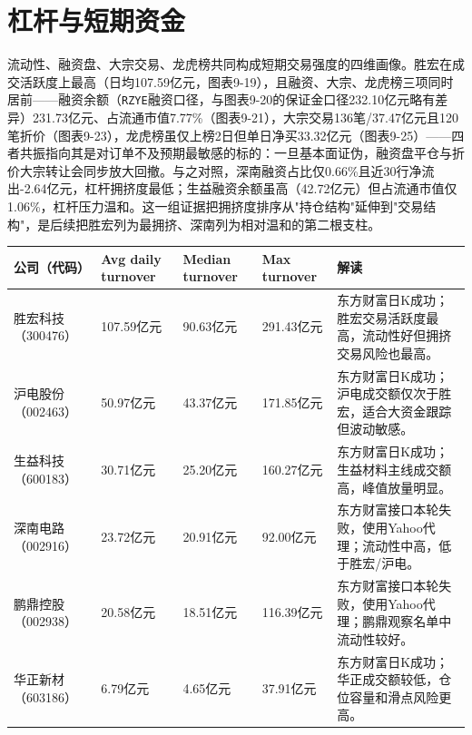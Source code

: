 \section{杠杆与短期资金}

流动性、融资盘、大宗交易、龙虎榜共同构成短期交易强度的四维画像。胜宏在成交活跃度上最高（日均107.59亿元，图表9-19），且融资、大宗、龙虎榜三项同时居前——融资余额（\texttt{RZYE}融资口径，与图表9-20的保证金口径232.10亿元略有差异）231.73亿元、占流通市值7.77\%（图表9-21），大宗交易136笔/37.47亿元且120笔折价（图表9-23），龙虎榜虽仅上榜2日但单日净买33.32亿元（图表9-25）——四者共振指向其是对订单不及预期最敏感的标的：一旦基本面证伪，融资盘平仓与折价大宗转让会同步放大回撤。与之对照，深南融资占比仅0.66\%且近30行净流出-2.64亿元，杠杆拥挤度最低；生益融资余额虽高（42.72亿元）但占流通市值仅1.06\%，杠杆压力温和。这一组证据把拥挤度排序从"持仓结构"延伸到"交易结构"，是后续把胜宏列为最拥挤、深南列为相对温和的第二根支柱。

\begin{exhibitbox}
\footnotesize
\begin{tabularx}{\textwidth}{L{1.8cm}R{1.8cm}R{1.8cm}R{1.8cm}X}
\toprule
\textbf{公司（代码）} & \textbf{Avg daily turnover} & \textbf{Median turnover} & \textbf{Max turnover} & \textbf{解读} \\
\midrule
胜宏科技（300476） & 107.59亿元 & 90.63亿元 & 291.43亿元 & 东方财富日K成功；胜宏交易活跃度最高，流动性好但拥挤交易风险也最高。 \\
沪电股份（002463） & 50.97亿元 & 43.37亿元 & 171.85亿元 & 东方财富日K成功；沪电成交额仅次于胜宏，适合大资金跟踪但波动敏感。 \\
生益科技（600183） & 30.71亿元 & 25.20亿元 & 160.27亿元 & 东方财富日K成功；生益材料主线成交额高，峰值放量明显。 \\
深南电路（002916） & 23.72亿元 & 20.91亿元 & 92.00亿元 & 东方财富接口本轮失败，使用Yahoo代理；流动性中高，低于胜宏/沪电。 \\
鹏鼎控股（002938） & 20.58亿元 & 18.51亿元 & 116.39亿元 & 东方财富接口本轮失败，使用Yahoo代理；鹏鼎观察名单中流动性较好。 \\
华正新材（603186） & 6.79亿元 & 4.65亿元 & 37.91亿元 & 东方财富日K成功；华正成交额较低，仓位容量和滑点风险更高。 \\
\bottomrule
\end{tabularx}
\end{exhibitbox}

